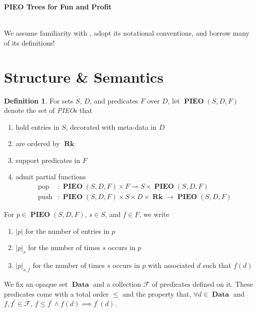 \documentclass{amsart}
\DeclareMathOperator{\halfto}{\rightharpoonup}
\DeclareMathOperator{\push}{\mathrm{push}}
\DeclareMathOperator{\pop}{\mathrm{pop}}
\DeclareMathOperator{\Rk}{\mathbf{Rk}}
\DeclareMathOperator{\Data}{\mathbf{Data}}
\DeclareMathOperator{\PIEO}{\mathbf{PIEO}}
\theoremstyle{definition}
\newtheorem{dfn}[thm]{Definition}
\begin{document}
\pagestyle{empty}

{\LARGE \textbf{PIEO Trees for Fun and Profit}}

\hrulefill\\

We assume familiarity with \cite{OG}, adopt its notational conventions, and borrow many of its definitions!

\section{Structure \& Semantics}

\begin{dfn}
    For sets $S$, $D$, and predicates $F$ over $D$,
    let $\PIEO(S, D, F)$ denote the set of \emph{PIEO}s that
    \begin{enumerate}
        \item hold entries in $S$, decorated with meta-data in $D$
        \item are ordered by $\Rk$
        \item support predicates in $F$
        \item admit partial functions 
        \begin{align*}
            \pop &: \PIEO(S, D, F) \times F \halfto S \times \PIEO(S, D, F) \\
            \push &: \PIEO(S, D, F) \times S \times D \times \Rk \to \PIEO(S, D, F) 
        \end{align*}
    \end{enumerate}
    For $p \in \PIEO(S, D, F)$, $s \in S$, and $f \in F$, we write 
    \begin{enumerate}
        \item $|p|$ for the number of entries in $p$
        \item $|p|_{s}$ for the number of times $s$ occurs in $p$
        \item $|p|_{s,f}$ for the number of times $s$ occurs in $p$ with associated $d$ such that $f(d)$
    \end{enumerate}
\end{dfn}

We fix an opaque set $\Data$ and a collection $\mathcal F$ of predicates defined on it.
These predicates come with a total order $\leq$ and the property that, $\forall d \in \Data$ and $f,f^\prime \in \mathcal F$,
$f \leq f^\prime \land f(d) \implies f^\prime(d)$.
\end{document}
